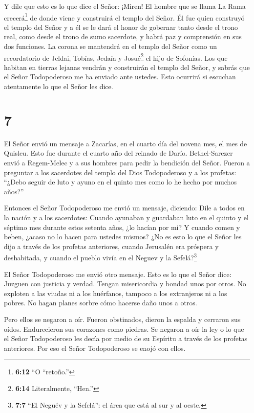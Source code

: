 Y dile que esto es lo que dice el Señor: ¡Miren! El hombre
que se llama La Rama crecerá\footnote{\textbf{6:12} ``O ``retoño.''} de
donde viene y construirá el templo del Señor.  Él fue quien
construyó el templo del Señor y a él se le dará el honor de gobernar
tanto desde el trono real, como desde el trono de sumo sacerdote, y
habrá paz y comprensión en sus dos funciones.  La corona se
mantendrá en el templo del Señor como un recordatorio de Jeldai, Tobías,
Jedaía y Josué\footnote{\textbf{6:14} Literalmente, ``Hen.''} el hijo de
Sofonías.  Los que habitan en tierras lejanas vendrán y
construirán el templo del Señor, y sabrás que el Señor Todopoderoso me
ha enviado ante ustedes. Esto ocurrirá si escuchan atentamente lo que el
Señor les dice.

\hypertarget{section-6}{%
\section{7}\label{section-6}}

 El Señor envió un mensaje a Zacarías, en el cuarto día del
novena mes, el mes de Quisleu. Esto fue durante el cuarto año del
reinado de Darío.  Bethel-Sarezer envió a Regem-Melec y a
sus hombres para pedir la bendición del Señor.  Fueron a
preguntar a los sacerdotes del templo del Dios Todopoderoso y a los
profetas: ``¿Debo seguir de luto y ayuno en el quinto mes como lo he
hecho por muchos años?''

 Entonces el Señor Todopoderoso me envió un mensaje,
diciendo:  Dile a todos en la nación y a los sacerdotes:
Cuando ayunaban y guardaban luto en el quinto y el séptimo mes durante
estos setenta años, ¿lo hacían por mi?  Y cuando comen y
beben, ¿acaso no lo hacen para ustedes mismos?  ¿No es esto
lo que el Señor les dijo a través de los profetas anteriores, cuando
Jerusalén era próspera y deshabitada, y cuando el pueblo vivía en el
Neguev y la Sefelá?\footnote{\textbf{7:7} ``El Neguév y la Sefelá'': el
  área que está al sur y al oeste.}

 El Señor Todopoderoso me envió otro mensaje. 
Esto es lo que el Señor dice: Juzguen con justicia y verdad. Tengan
misericordia y bondad unos por otros.  No exploten a las
viudas ni a los huérfanos, tampoco a los extranjeros ni a los pobres. No
hagan planes sorbre cómo hacerse daño unos a otros.

 Pero ellos se negaron a oír. Fueron obstinados, dieron la
espalda y cerraron sus oídos.  Endurecieron sus corazones
como piedras. Se negaron a oír la ley o lo que el Señor Todopoderoso les
decía por medio de su Espíritu a través de los profetas anteriores. Por
eso el Señor Todopoderoso se enojó con ellos.

